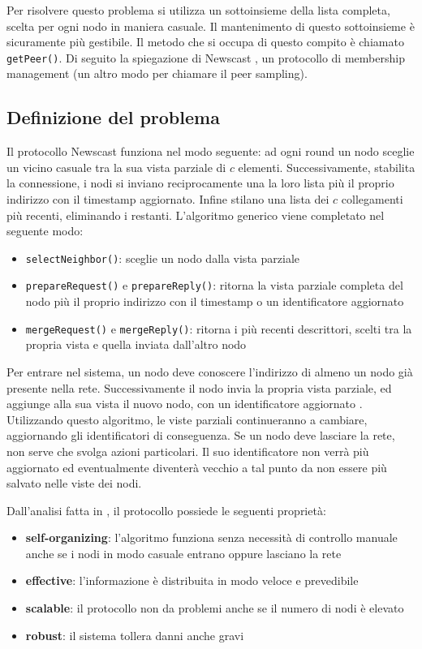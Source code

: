 Per risolvere questo problema si utilizza un sottoinsieme della lista completa, scelta per ogni nodo in maniera casuale. Il mantenimento di questo sottoinsieme è sicuramente più gestibile. 
Il metodo che si occupa di questo compito è chiamato \texttt{getPeer()}.
Di seguito la spiegazione di Newscast \cite{newscast}, un protocollo di membership management (un altro modo per chiamare il peer sampling).

\subsection{Definizione del problema}
Il protocollo Newscast funziona nel modo seguente: ad ogni round un nodo sceglie un vicino casuale tra la sua vista parziale di $c$ elementi. Successivamente, stabilita la connessione, i nodi si inviano reciprocamente una la loro lista più il proprio indirizzo con il timestamp aggiornato. Infine stilano una lista dei $c$ collegamenti più recenti, eliminando i restanti.
L’algoritmo generico viene completato nel seguente modo:
\begin{itemize}
    \item \texttt{selectNeighbor()}: sceglie un nodo dalla vista parziale
    \item \texttt{prepareRequest()} e \texttt{prepareReply()}: ritorna la vista parziale completa del nodo più il proprio indirizzo con il timestamp o un identificatore aggiornato
    \item \texttt{mergeRequest()} e \texttt{mergeReply()}: ritorna i più recenti descrittori, scelti tra la propria vista e quella inviata dall’altro nodo
\end{itemize}
Per entrare nel sistema, un nodo deve conoscere l'indirizzo di almeno un nodo già presente nella rete. Successivamente il nodo invia la propria vista parziale, ed aggiunge alla sua vista il nuovo nodo, con un identificatore aggiornato \cite{montresor}. Utilizzando questo algoritmo, le viste parziali continueranno a cambiare, aggiornando gli identificatori di conseguenza. Se un nodo deve lasciare la rete, non serve che svolga azioni particolari. Il suo identificatore non verrà più aggiornato ed eventualmente diventerà vecchio a tal punto da non essere più salvato nelle viste dei nodi.

Dall'analisi fatta in \cite{membership}, il protocollo possiede le seguenti proprietà:
\begin{itemize}
    \item \textbf{self-organizing}: l'algoritmo funziona senza necessità di controllo manuale anche se i nodi in modo casuale entrano oppure lasciano la rete
    \item \textbf{effective}: l'informazione è distribuita in modo veloce e prevedibile
    \item \textbf{scalable}: il protocollo non da problemi anche se il numero di nodi è elevato
    \item \textbf{robust}: il sistema tollera danni anche gravi
\end{itemize} 

